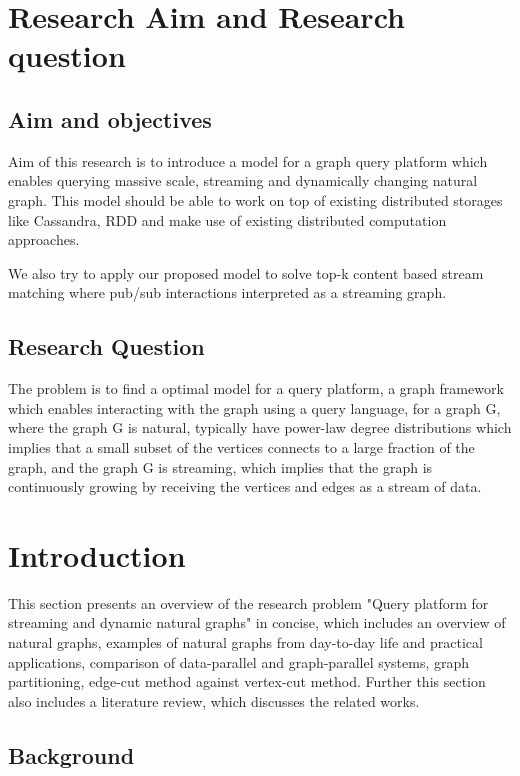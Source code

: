 \documentclass[12pt]{article}
\begin{document}
\section{Research Aim and Research question}

\subsection{Aim and objectives}

Aim of this research is to introduce a model for a graph query platform which enables querying massive scale, streaming and dynamically changing natural graph. This model should be able to work on top of existing distributed storages like Cassandra, RDD and make use of existing distributed computation approaches.

We also try to apply our proposed model to solve top-k content based stream matching where pub/sub interactions interpreted as a streaming graph.
 
\subsection{Research Question}
The problem is to find a optimal model for a query platform, a graph framework which enables interacting with the graph using a query language, for a graph G, where the graph G is natural, typically have power-law degree distributions which implies that a small subset of the vertices connects to a large fraction of the graph, and the graph G is streaming, which implies that the graph is continuously growing by receiving the vertices and edges as a stream of data.  

\clearpage 
\section{Introduction}

This section presents an overview of the research problem "Query platform for streaming and dynamic natural graphs" in concise, which includes an overview of natural graphs, examples of natural graphs from day-to-day life and practical applications, comparison of data-parallel and graph-parallel systems, graph partitioning, edge-cut method against vertex-cut method. Further this section also  includes a literature review, which discusses the related works. 

\subsection{Background} 
\end{document}
